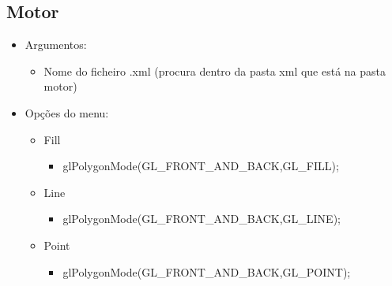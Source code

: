 \documentclass{report}
\begin{document}
\subsection{Motor}
\begin{itemize}
\item Argumentos:
    \begin{itemize}
        \item Nome do ficheiro .xml (procura dentro da pasta xml que está na pasta motor)
    \end{itemize}
\item Op\c{c}\~oes do menu:
    \begin{itemize}
        \item Fill 
            \begin{itemize}
                \item glPolygonMode(GL\_FRONT\_AND\_BACK,GL\_FILL);
            \end{itemize}
        \item Line
            \begin{itemize}
                \item glPolygonMode(GL\_FRONT\_AND\_BACK,GL\_LINE);
            \end{itemize}
        \item Point
            \begin{itemize}
                \item glPolygonMode(GL\_FRONT\_AND\_BACK,GL\_POINT);
            \end{itemize}
        

\end{itemize}
\end{itemize}
\end{document}
